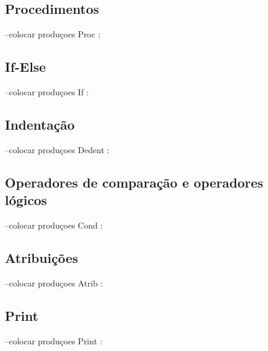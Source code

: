 \documentclass[11pt,a4paper]{report}
\begin{document}
    \paragraph{}
    \subsection{Procedimentos}
       --colocar produçoes Proc :

    \paragraph{}
    \subsection{If-Else}
       --colocar produçoes  If :

    \paragraph{}
    \subsection{Indentação}
       --colocar produçoes Dedent :

    \paragraph{}
    \subsection{Operadores de comparação e operadores lógicos}
       --colocar produçoes Cond :

    \paragraph{}
    \subsection{Atribuições}
       --colocar produçoes Atrib :

    \paragraph{}
    \subsection{Print}
       --colocar produçoes Print :
\end{document}

